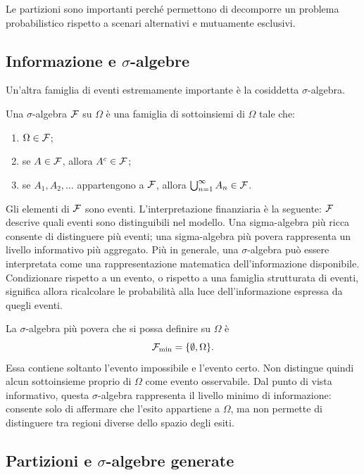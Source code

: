 Le partizioni sono importanti perch\'{e} permettono di decomporre un problema
probabilistico rispetto a scenari alternativi e mutuamente esclusivi.

\subsection{Informazione e $\sigma$-algebre}

Un'altra famiglia di eventi estremamente importante \`{e} la cosiddetta $\sigma$-algebra.
\begin{definition}
Una $\sigma$-algebra $\mathcal{F}$ su $\Omega$ \`{e} una famiglia di sottoinsiemi
di $\Omega$ tale che:

\begin{enumerate}
\item $\Omega\in\mathcal{F}$;

\item se $A\in\mathcal{F}$, allora $A^{c}\in\mathcal{F}$;

\item se $A_{1},A_{2},\ldots$ appartengono a $\mathcal{F}$, allora
$\bigcup_{n=1}^{\infty} A_{n}\in\mathcal{F}$.
\end{enumerate}
\end{definition}

Gli elementi di $\mathcal{F}$ sono eventi. L'interpretazione finanziaria \`{e} la seguente: $\mathcal{F}$ descrive quali
eventi sono distinguibili nel modello. Una sigma-algebra pi\`{u} ricca
consente di distinguere pi\`{u} eventi; una sigma-algebra pi\`{u} povera
rappresenta un livello informativo pi\`{u} aggregato. Pi\`{u} in generale, una $\sigma$-algebra pu\`{o} essere interpretata come una rappresentazione matematica dell'informazione disponibile. Condizionare rispetto a un evento, o rispetto a una famiglia strutturata di eventi, significa allora ricalcolare le probabilit\`{a} alla luce dell'informazione espressa da quegli eventi. 

La $\sigma$-algebra pi\`{u} povera che si possa definire su $\Omega$ \`{e}
\[
\mathcal{F}_{\min}=\{\emptyset,\Omega\}.
\]
Essa contiene soltanto l'evento impossibile e l'evento certo. 
Non distingue quindi alcun sottoinsieme proprio di $\Omega$ come evento osservabile. 
Dal punto di vista informativo, questa $\sigma$-algebra rappresenta il livello
minimo di informazione: consente solo di affermare che l'esito appartiene a
$\Omega$, ma non permette di distinguere tra regioni diverse dello spazio degli esiti.

\subsection{Partizioni e $\sigma$-algebre generate}

